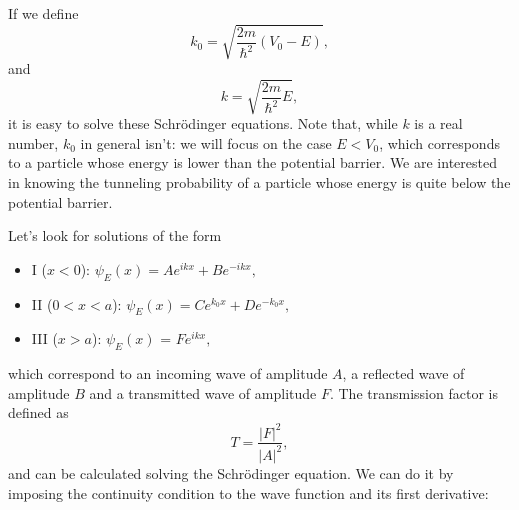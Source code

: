 If we define
\begin{equation*}
    k_0 = \sqrt{\frac{2m}{\hslash^2}(V_0 - E)},
\end{equation*}
and
\begin{equation*}
    k = \sqrt{\frac{2m}{\hslash^2}E},
\end{equation*}
it is easy to solve these Schr\"odinger equations. Note that, while \(k\) is a real number, \(k_0\) in general isn't: we will focus on the case \(E<V_0\), which corresponds to a particle whose energy is lower than the potential barrier. We are interested in knowing the tunneling probability of a particle whose energy is quite below the potential barrier. 

Let's look for solutions of the form
\begin{itemize}
    \item I ($x<0$): $\psi_E(x) = Ae^{ikx} + Be^{-ikx},$
    \item II ($0<x<a$): $\psi_E(x) = Ce^{k_0x}+De^{-k_0x},$
    \item III ($x>a$): $\psi_E(x)$ = $Fe^{ikx},$
\end{itemize}
which correspond to an incoming wave of amplitude $A$, a reflected wave of amplitude $B$ and a transmitted wave of amplitude $F$. The transmission factor is defined as
\begin{equation*}
    T = \frac{|F|^2}{|A|^2},
\end{equation*}
and can be calculated solving the Schr\"odinger equation. We can do it by imposing the continuity condition to the wave function and its first derivative:
